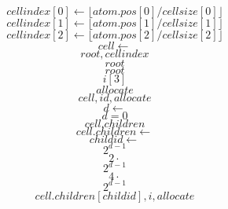 \documentclass{scrreprt}
\begin{document}
\begin{equation}
cellindex[0] \gets \lfloor atom.pos[0] / cellsize[0] \rfloor
\end{equation}
\begin{equation}
cellindex[1] \gets \lfloor atom.pos[1] / cellsize[1] \rfloor
\end{equation}
\begin{equation}
cellindex[2] \gets \lfloor atom.pos[2] / cellsize[2] \rfloor
\end{equation}
\begin{equation}
cell \gets
\end{equation}
\begin{equation}
root, cellindex
\end{equation}
\begin{equation}
root
\end{equation}
\begin{equation}
root
\end{equation}
\begin{equation}
i[3]
\end{equation}
\begin{equation}
allocate
\end{equation}
\begin{equation}
cell, id, allocate
\end{equation}
\begin{equation}
d \gets 
\end{equation}
\begin{equation}
d = 0
\end{equation}
\begin{equation}
cell.children
\end{equation}
\begin{equation}
cell.children \gets 
\end{equation}
\begin{equation}
childid \gets 
\end{equation}
\begin{equation}
2^{d-1}
\end{equation}
\begin{equation}
2\cdot
\end{equation}
\begin{equation}
2^{d-1}
\end{equation}
\begin{equation}
4\cdot
\end{equation}
\begin{equation}
2^{d-1}
\end{equation}
\begin{equation}
cell.children[childid], i, allocate
\end{equation}
\end{document}
